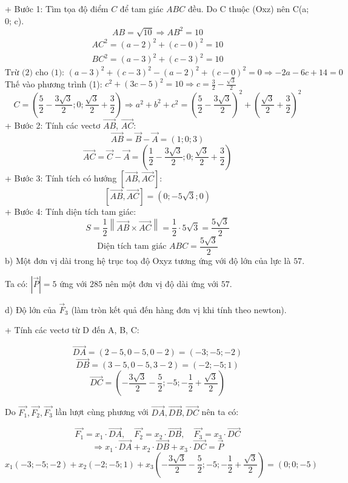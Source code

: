 \documentclass[a4paper,12pt]{article}
\begin{document}
+ Bước 1: Tìm tọa độ điểm \(C\) để tam giác \(ABC\) đều.
Do C thuộc (Oxz) nên C(a; 0; c).
\[ AB = \sqrt{10} \Rightarrow AB^2 = 10 \]
\begin{align}
AC^2 = (a - 2)^2 + (c - 0)^2 = 10 \tag{1} \\
BC^2 = (a - 3)^2 + (c - 3)^2 = 10 \tag{2}
\end{align}
\[\text{Trừ (2) cho (1): }(a - 3)^2 + (c - 3)^2 - (a - 2)^2 + (c - 0)^2 = 0 \Rightarrow - 2 a - 6 c + 14 = 0\]
Thế vào phương trình (1): \(c^{2} + \left(3 c - 5\right)^{2} = 10 \Rightarrow c=\frac{3}{2} - \frac{\sqrt{3}}{2}\)
\[C = (\frac{5}{2} - \frac{3 \sqrt{3}}{2}; 0; \frac{\sqrt{3}}{2} + \frac{3}{2}) \Rightarrow a^2+b^2+c^2=\left(\frac{5}{2} - \frac{3 \sqrt{3}}{2}\right)^{2} + \left(\frac{\sqrt{3}}{2} + \frac{3}{2}\right)^{2}\]
+ Bước 2: Tính các vectơ \(\overrightarrow{AB}\), \(\overrightarrow{AC}\):
\[ \overrightarrow{AB} = \overrightarrow{B} - \overrightarrow{A} = (1; 0; 3) \]
\[ \overrightarrow{AC} = \overrightarrow{C} - \overrightarrow{A} = (\frac{1}{2} - \frac{3 \sqrt{3}}{2}; 0; \frac{\sqrt{3}}{2} + \frac{3}{2}) \]
+ Bước 3: Tính tích có hướng \(\left[\overrightarrow{AB}, \overrightarrow{AC}\right]\):
\[ [\overrightarrow{AB},  \overrightarrow{AC}] = (0; - 5 \sqrt{3}; 0) \]
+ Bước 4: Tính diện tích tam giác:
\[
S = \frac{1}{2} \left\| \overrightarrow{AB} \times \overrightarrow{AC} \right\| = \frac{1}{2} \cdot 5 \sqrt{3}
= \frac{5 \sqrt{3}}{2}
\]
\[\text{Diện tích tam giác } ABC = \frac{5 \sqrt{3}}{2}\]
b) Một đơn vị dài trong hệ trục toạ độ Oxyz tương ứng với độ lớn của lực là \(57\).


Ta có: \(|\overrightarrow{P}| = 5\) ứng với \(285\) nên một đơn vị độ dài ứng với \(57\).




d) Độ lớn của \(\overrightarrow{F}_3\) (làm tròn kết quả đến hàng đơn vị khi tính theo newton).


+ Tính các vectơ từ D đến A, B, C:


\[ \overrightarrow{DA} = (2 - 5, 0 - 5, 0 - 2) = (-3; -5; -2) \]
\[ \overrightarrow{DB} = (3 - 5, 0 - 5, 3 - 2) = (-2; -5; 1) \]
\[ \overrightarrow{DC} = (- \frac{3 \sqrt{3}}{2} - \frac{5}{2}; -5; - \frac{1}{2} + \frac{\sqrt{3}}{2}) \]


Do \(\overrightarrow{F_1},\overrightarrow{F_2}, \overrightarrow{F_3}\) lần lượt cùng phương với \(\overrightarrow{DA}, \overrightarrow{DB}, \overrightarrow{DC}\) nên ta có:


\[ \overrightarrow{F_1} = x_1 \cdot \overrightarrow{DA},\quad \overrightarrow{F_2} = x_2 \cdot \overrightarrow{DB},\quad \overrightarrow{F_3} = x_3 \cdot \overrightarrow{DC} \]
\[ \Rightarrow x_1 \cdot \overrightarrow{DA} + x_2 \cdot \overrightarrow{DB} + x_3 \cdot \overrightarrow{DC} = \overrightarrow{P} \]
\[ x_1(-3; -5; -2) + x_2(-2; -5; 1) + x_3(- \frac{3 \sqrt{3}}{2} - \frac{5}{2}; -5; - \frac{1}{2} + \frac{\sqrt{3}}{2}) = (0; 0; -5) \]
\end{document}
